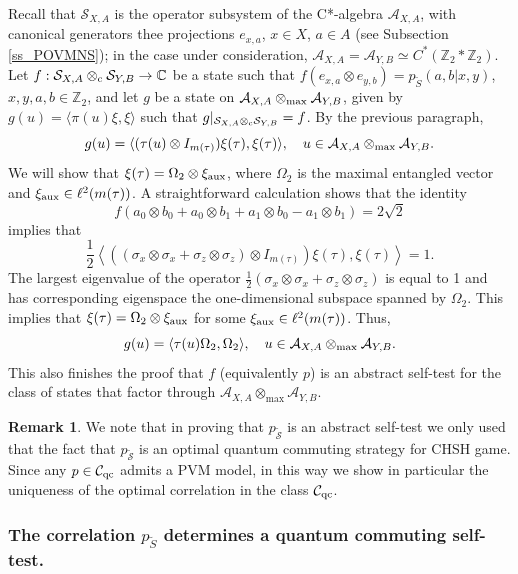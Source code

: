 \documentclass[11pt]{amsart}
\theoremstyle{definition}
\newtheorem{remark}[theorem]{Remark}
\newcommand{\cl}[1]{\mathcal{#1}}
\begin{document}
Recall that $\cl S_{X,A}$ is the operator subsystem of 
the C*-algebra $\cl A_{X,A}$,
with canonical generators thee projections $e_{x,a}$, $x\in X$, $a\in A$
(see Subsection \ref{ss_POVMNS}); 
in the case under consideration, 
$\cl A_{X,A} = \cl A_{Y,B} \simeq C^*(\mathbb Z_2\ast\mathbb Z_2)$. 
Let $f:\cl S_{X,A}\otimes_{\rm c}\cl S_{Y,B}\to\mathbb C$ be a state such that $f(e_{x,a}\otimes e_{y,b})=p_{\tilde S}(a,b|x,y)$, $x,y,a,b\in\mathbb Z_2$,  and let $g$ be a state on $\cl A_{X,A}\otimes_{\rm max} \cl A_{Y,B}$,
given by $g(u) = \langle\pi(u)\xi,\xi\rangle$ such that $g|_{\cl S_{X,A}\otimes_{\rm c}\cl S_{Y,B}}=f$.
By the previous paragraph,
$$g(u) = \langle (\tau(u)\otimes I_{m(\tau)})\xi(\tau),\xi(\tau)\rangle,  \ \ \ 
u\in \cl A_{X,A}\otimes_{\rm max} \cl A_{Y,B}.$$
We will show that $\xi(\tau) = \Omega_2\otimes\xi_{\rm aux}$, where $\Omega_2$ is the maximal entangled vector and $\xi_{\rm aux}\in \ell^2(m(\tau))$. A straightforward calculation shows that 
the identity
$$f(a_0\otimes b_0+a_0\otimes b_1+a_1\otimes b_0-a_1\otimes b_1)=2\sqrt{2}$$
implies that
        $$\frac{1}{2}
\left\langle((\sigma_x\otimes\sigma_x+\sigma_z\otimes\sigma_z)\otimes I_{m(\tau)})\xi(\tau),\xi(\tau)\right\rangle = 1.$$
The largest eigenvalue of the operator $\frac{1}{2}(\sigma_x\otimes\sigma_x+\sigma_z\otimes\sigma_z)$ 
is equal to 1 and has corresponding eigenspace the one-dimensional subspace spanned by $\Omega_2$.  
This implies that $\xi(\tau)=\Omega_2\otimes \xi_{\rm aux}$ for some $\xi_{\rm aux}\in \ell^2(m(\tau))$. Thus,
$$g(u) = \langle\tau(u)\Omega_2,\Omega_2\rangle, \ \ \ 
u\in \cl A_{X,A}\otimes_{\rm max} \cl A_{Y,B}.$$
This also finishes the proof that $f$ (equivalently $p$) is an abstract self-test for the class of states that factor through $\cl A_{X,A}\otimes_{\max}\cl A_{Y,B}$.  

\begin{remark} \label{optimal} 
We note that in proving that 
$p_{\tilde{\cl S}}$ is an abstract self-test 
we only used that the fact that $p_{\tilde{\cl  S}}$ is an optimal quantum commuting strategy for CHSH game. Since any $p\in\cl C_{\rm qc}$ admits a PVM model, in this way we show in particular the uniqueness of the optimal correlation in the class $\cl C_{\rm qc}$.
\end{remark}


\subsubsection{The correlation $p_{\tilde S}$ determines a 
quantum commuting self-test.}
\end{document}
